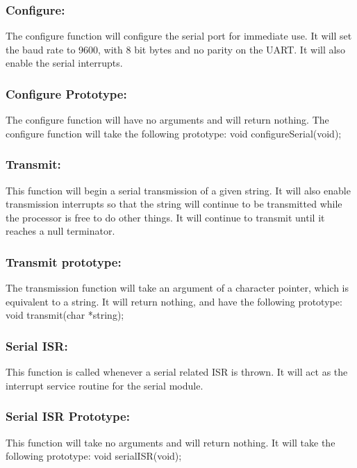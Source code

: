 \documentclass[]{article}
\begin{document}
\subsubsection{Configure:}
The configure function will configure the serial port for immediate use. It will set the baud rate to 9600, with 8 bit bytes and no parity on the UART. It will also enable the serial interrupts.

\subsubsection{Configure Prototype:}
The configure function will have no arguments and will return nothing. The configure function will take the following prototype: \newline \newline
void configureSerial(void);

\subsubsection{Transmit:}
This function will begin a serial transmission of a given string. It will also enable transmission interrupts so that the string will continue to be transmitted while the processor is free to do other things. It will continue to transmit until it reaches a null terminator.

\subsubsection{Transmit prototype:}
The transmission function will take an argument of a character pointer, which is equivalent to a string. It will return nothing, and have the following prototype: \newline \newline
void transmit(char *string);

\subsubsection{Serial ISR:}
This function is called whenever a serial related ISR is thrown. It will act as the interrupt service routine for the serial module.

\subsubsection{Serial ISR Prototype:}
This function will take no arguments and will return nothing. It will take the following prototype: \newline \newline
void serialISR(void);
\end{document}
